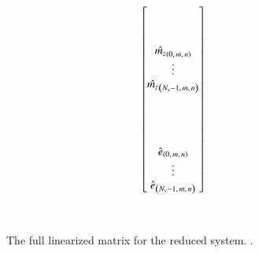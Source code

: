 \documentclass[letterpaper,11pt,nointlimits,reqno,draft]{amsart}
\begin{document}
\begin{sidewaysfigure}
{{\begin{minipage}[c]{\textwidth}
\begin{align*}
\begin{bmatrix}
\\%
\\%
\\%
  \hat{\mz}_{\left(0,\,m,\,n\right)} \\
  \vdots \\
  \hat{\mz}_{\left(N_y-1,\,m,\,n\right)} \\
\\%
\\%
\\%
\\%
  \hat{e}_{\left(0,\,m,\,n\right)} \\
  \vdots \\
  \hat{e}_{\left(N_y-1,\,m,\,n\right)} \\
%
\end{bmatrix}
\end{align*}
\end{minipage}}}  %
\vspace{2em}
\\
\caption[The discrete operator $M+\varphi{}L$ used for implicit time advance]
{
    The full linearized matrix for the reduced system.  . 
}
\label{fig:discreteimplicitop2}
\end{sidewaysfigure}
\end{document}
